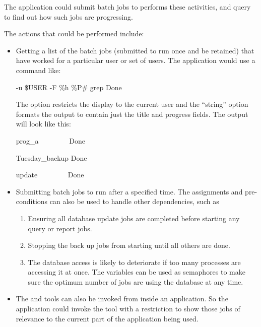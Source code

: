The application could submit batch jobs to performs these activities, and query \ProductName{} to find out how such jobs are progressing.

The actions that could be performed include:

\begin{itemize}
\item Getting a list of the batch jobs (submitted to run once and be retained) that have worked for a particular user or set of users. The
application would use a command like:

\begin{expara}

\BtjlistName{} -u \$USER -F {\textquotedbl}\%h \%P\#{\textquotedbl} {\textbar}
grep {\textquotedbl}Done{\textquotedbl}

\end{expara}

The option  restricts the display to the current user and the 
``string'' option formats the output to contain just the title and progress fields. The output will look like
this:

\begin{expara}

prog\_a \ \ \ \ \ \ \ \ Done

Tuesday\_backup Done

update \ \ \ \ \ \ \ \ Done

\end{expara}

\item Submitting batch jobs to run after a specified time. The assignments and pre-conditions can also be used to handle other
dependencies, such as

\begin{enumerate}
\item Ensuring all database update jobs are completed before starting any query or report jobs.
\item Stopping the back up jobs from starting until all others are done.
\item The database access is likely to deteriorate if too many processes are accessing it at once. The variables can be used as semaphores to
make sure the optimum number of jobs are using the database at any time.
\end{enumerate}
\item The \PrBtq{} and \PrXmbtq{} tools can also be invoked from inside an application. So the application could invoke the
tool with a restriction to show those jobs of relevance to the current part of the application being used.
\end{itemize}
